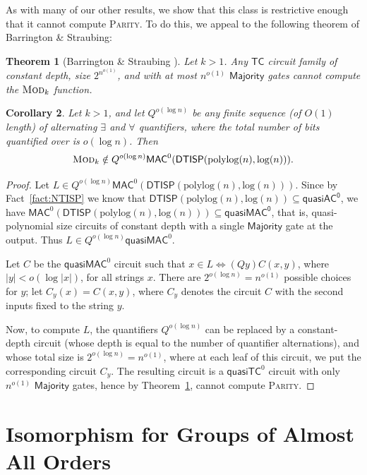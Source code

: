 \documentclass{article}
\newtheorem{theorem}{Theorem}\newtheorem{lemma}[theorem]{Lemma}\newtheorem{proposition}[theorem]{Proposition}\newtheorem{corollary}[theorem]{Corollary}\newtheorem{definition}[theorem]{Definition}\newtheorem{claim}[theorem]{Claim}\newtheorem{remark}[theorem]{Remark}\newtheorem{observation}[theorem]{Observation}\newtheorem{conjecture}[theorem]{Conjecture}\newtheorem{example}[theorem]{Example}
\newcommand{\algprobm}[1]{\textsc{#1}\xspace}
\newcommand*{\ComplexityClass}[1]{\ensuremath{\mathsf{#1}}\xspace}
\newcommand{\DTISP}{\ComplexityClass{DTISP}}
\newcommand{\DTISPpll}{\ensuremath{\DTISP(\mathrm{polylog}(n),\mathrm{log}(n))}\xspace}
\newcommand{\qACz}{\ComplexityClass{quasiAC^0}}
\begin{document}
As with many of our other results, we show that this class is restrictive enough that it cannot compute \algprobm{Parity}. To do this, we appeal to the following theorem of Barrington \& Straubing:

\begin{theorem}[{Barrington \& Straubing \cite[Thm.~7]{BS}}] \label{thm:BS}
Let $k > 1$. Any $\mathsf{TC}$ circuit family of constant depth, size $2^{n^{o(1)}}$, and with at most $n^{o(1)}$ $\mathsf{Majority}$ gates cannot compute the $\algprobm{Mod}_k$ function.
\end{theorem}

\begin{corollary} \label{cor:MAC}
Let $k > 1$, and let $Q^{o(\log n)}$ be any finite sequence (of $O(1)$ length) of alternating $\exists$ and $\forall$ quantifiers, where the total number of bits quantified over is $o(\log n)$. Then 
\[
\algprobm{Mod}_k \notin Q^{o(\log n)} \mathsf{MAC}^0(\DTISPpll).
\]
\end{corollary}

\begin{proof}
Let $L \in Q^{o(\log n)} \mathsf{MAC}^0(\DTISPpll)$. 
Since by Fact~\ref{fact:NTISP} we know that $\DTISPpll \subseteq \qACz$, we have $\mathsf{MAC}^0(\DTISPpll) \subseteq \mathsf{quasiMAC^0}$, that is, quasi-polynomial size circuits of constant depth with a single $\mathsf{Majority}$ gate at the output. Thus $L \in Q^{o(\log n)} \mathsf{quasiMAC}^0$. 


Let $C$ be the $\mathsf{quasiMAC}^0$ circuit such that $x \in L \iff (Qy) C(x,y)$, where $|y| < o(\log |x|)$, for all strings $x$. There are $2^{o(\log n)}=n^{o(1)}$ possible choices for $y$; let $C_y(x) = C(x,y)$, where $C_y$ denotes the circuit $C$ with the second inputs fixed to the string $y$.

Now, to compute $L$, the quantifiers $Q^{o(\log n)}$ can be replaced by a constant-depth circuit (whose depth is equal to the number of quantifier alternations), and whose total size is $2^{o(\log n)} = n^{o(1)}$, where at each leaf of this circuit, we put the corresponding circuit $C_y$. The resulting circuit is a $\mathsf{quasiTC}^0$ circuit with only $n^{o(1)}$ $\mathsf{Majority}$ gates, hence by Theorem~\ref{thm:BS}, cannot compute \algprobm{Parity}.
\end{proof}




\section{Isomorphism for Groups of Almost All Orders}
\end{document}
